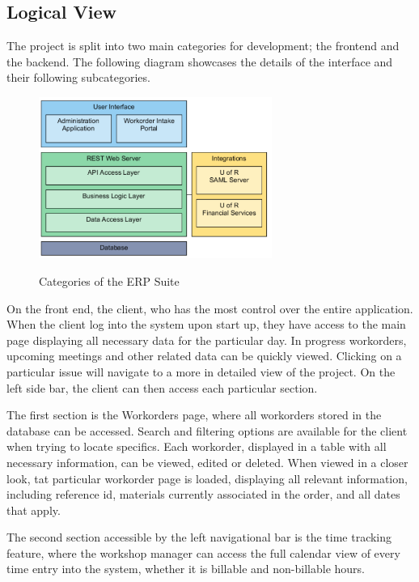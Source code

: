 {{{{{\subsection{Logical View}
The project is split into two main categories for development; the frontend and the backend. The following diagram showcases the details of the interface and their following subcategories. 
\begin{figure}[h]
	\centering
	\includegraphics[width=3in]{front-back.png}\\
	\caption{Categories of the ERP Suite}
	\label{fig:tobias}
\end{figure}
\newline

On the front end, the client, who has the most control over the entire application. When the client log into the system upon start up, they have access to the main page displaying all necessary data for the particular day. In progress workorders, upcoming meetings and other related data can be quickly viewed. Clicking on a particular issue will navigate to a more in detailed view of the project. On the left side bar, the client can then access each particular section. 
\newline
{\setlength{\parindent}{0cm}

The first section is the Workorders page, where all workorders stored in the database can be accessed. Search and filtering options are available for the client when trying to locate specifics. Each workorder, displayed in a table with all necessary information, can be viewed, edited or deleted. When viewed in a closer look, tat particular workorder page is loaded, displaying all relevant information, including reference id, materials currently associated in the order, and all dates that apply. 
\newline
{\setlength{\parindent}{0cm}

The second section accessible by the left navigational bar is the time tracking feature, where the workshop manager can access the full calendar view of every time entry into the system, whether it is billable and non-billable hours. 

}}}}}}}
